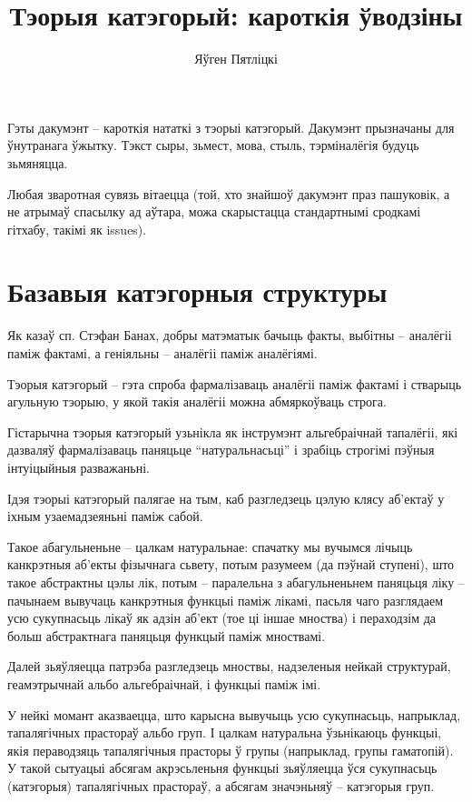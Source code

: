 \documentclass[a4paper,12pt]{book}
\title{Тэорыя катэгорый: кароткія ўводзіны}
\author{Яўген Пятліцкі}
\begin{document}
\maketitle

Гэты дакумэнт -- кароткія нататкі з тэорыі катэгорый. Дакумэнт
прызначаны для ўнутранага ўжытку. Тэкст сыры, зьмест, мова, стыль,
тэрміналёгія будуць зьмяняцца.

Любая зваротная сувязь вітаецца (той, хто знайшоў дакумэнт праз
пашуковік, а не атрымаў спасылку ад аўтара, можа скарыстацца
стандартнымі сродкамі гітхабу, такімі як issues).

\tableofcontents

\chapter{Базавыя катэгорныя структуры}

Як казаў сп. Стэфан Банах, добры матэматык бачыць факты, выбітны --
аналёгіі паміж фактамі, а геніяльны -- аналёгіі паміж аналёгіямі.

Тэорыя катэгорый -- гэта спроба фармалізаваць аналёгіі паміж фактамі і
стварыць агульную тэорыю, у якой такія аналёгіі можна абмяркоўваць
строга.

Гістарычна тэорыя катэгорый узьнікла як інструмэнт альгебраічнай
тапалёгіі, які дазваляў фармалізаваць паняцьце ``натуральнасьці'' і
зрабіць строгімі пэўныя інтуіцыйныя разважаньні.

Ідэя тэорыі катэгорый палягае на тым, каб разгледзець цэлую клясу
аб'ектаў у іхным узаемадзеяньні паміж сабой.

Такое абагульненьне -- цалкам натуральнае: спачатку мы вучымся лічыць
канкрэтныя аб'екты фізычнага сьвету, потым разумеем (да пэўнай ступені), што такое
абстрактны цэлы лік, потым -- паралельна з абагульненьнем паняцьця
ліку -- пачынаем вывучаць канкрэтныя функцыі паміж лікамі, пасьля чаго
разглядаем усю сукупнасьць лікаў як адзін аб'ект (тое ці іншае
мноства) і пераходзім да больш абстрактнага паняцьця функцый паміж
мноствамі.

Далей зьяўляецца патрэба разгледзець мноствы, надзеленыя нейкай
структурай, геамэтрычнай альбо альгебраічнай, і функцыі паміж імі.

У нейкі момант аказваецца, што карысна вывучыць усю сукупнасьць,
напрыклад, тапалягічных прастораў альбо груп. І цалкам натуральна
ўзьнікаюць функцыі, якія пераводзяць тапалягічныя прасторы ў групы
(напрыклад, групы гаматопій). У такой сытуацыі абсягам акрэсьленьня
функцыі зьяўляецца ўся сукупнасьць (катэгорыя) тапалягічных прастораў,
а абсягам значэньняў -- катэгорыя груп.
\end{document}
